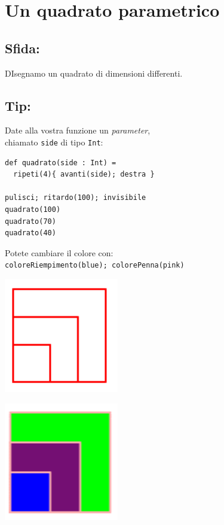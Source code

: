 \chapter{Un quadrato parametrico}
\begin{multicols}{2}
\section*{\color{BrickRed}Sfida:}
DIsegnamo un quadrato di dimensioni differenti.
\section*{\color{OliveGreen}Tip:}
Date alla vostra funzione un {\it parameter},\\
chiamato \lstinline{side} di tipo \lstinline{Int}:

\begin{lstlisting}[basicstyle={\ttfamily\fontsize{16}{19}\selectfont},numbers=none]
def quadrato(side : Int) = 
  ripeti(4){ avanti(side); destra }

pulisci; ritardo(100); invisibile
quadrato(100) 
quadrato(70)
quadrato(40)
\end{lstlisting}
        
Potete cambiare il colore con:\\
\lstinline{coloreRiempimento(blue); colorePenna(pink)}


\columnbreak


\begin{center}
\includegraphics[width=5.0cm]{../img/square-param.png}
\end{center}

\begin{center}
\includegraphics[width=5.0cm]{../img/square-param-color.png}
\end{center}

\end{multicols}

